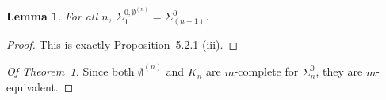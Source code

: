 \documentclass{article}
\newtheorem{lemma}[theorem]{Lemma}
\newcommand{\njump}{\emptyset^{(n)}}
\begin{document}
  \begin{lemma}
    For all $n$, $\Sigma^{0, \njump}_1 = \Sigma^0_{(n+1)}$.
  \end{lemma}

  \begin{proof}
    This is exactly Proposition~5.2.1 (iii).
  \end{proof}

  \begin{proof}[Of Theorem~1]
    Since both $\njump$ and $K_n$ are $m$-complete for $\Sigma^0_n$, they are $m$-equivalent.
  \end{proof}
\end{document}
